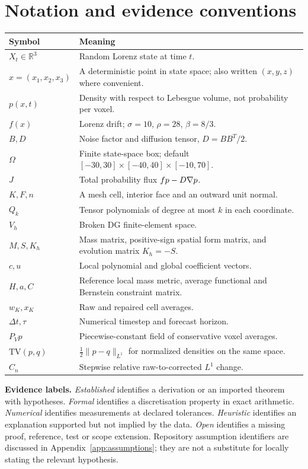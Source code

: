 \documentclass[11pt,oneside]{book}
\theoremstyle{definition}\newtheorem{definition}[theorem]{Definition}\newtheorem{example}[theorem]{Example}
\theoremstyle{remark}\newtheorem{remark}[theorem]{Remark}
\newcommand{\R}{\mathbb R}\newcommand{\E}{\mathbb E}\newcommand{\Prob}{\mathbb P}
\begin{document}
\chapter*{Notation and evidence conventions}
\begin{longtable}{p{}p{}}
\toprule Symbol & Meaning\\\midrule\endhead
$X_t\in\R^3$ & Random Lorenz state at time $t$.\\
$x=(x_1,x_2,x_3)$ & A deterministic point in state space; also written $(x,y,z)$ where convenient.\\
$p(x,t)$ & Density with respect to Lebesgue volume, not probability per voxel.\\
$f(x)$ & Lorenz drift; $\sigma=10$, $\rho=28$, $\beta=8/3$.\\
$B,D$ & Noise factor and diffusion tensor, $D=BB^T/2$.\\
$\Omega$ & Finite state-space box; default $[-30,30]\times[-40,40]\times[-10,70]$.\\
$J$ & Total probability flux $fp-D\nabla p$.\\
$K,F,n$ & A mesh cell, interior face and an outward unit normal.\\
$Q_k$ & Tensor polynomials of degree at most $k$ in each coordinate.\\
$V_h$ & Broken DG finite-element space.\\
$M,S,K_h$ & Mass matrix, positive-sign spatial form matrix, and evolution matrix $K_h=-S$.\\
$c,u$ & Local polynomial and global coefficient vectors.\\
$H,a,C$ & Reference local mass metric, average functional and Bernstein constraint matrix.\\
$w_K,x_K$ & Raw and repaired cell averages.\\
$\Delta t,\tau$ & Numerical timestep and forecast horizon.\\
$P_Vp$ & Piecewise-constant field of conservative voxel averages.\\
$\mathrm{TV}(p,q)$ & $\frac12\|p-q\|_{L^1}$ for normalized densities on the same space.\\
$C_n$ & Stepwise relative raw-to-corrected $L^1$ change.\\
\bottomrule\end{longtable}
\noindent\textbf{Evidence labels.} \emph{Established} identifies a derivation or an imported theorem with hypotheses. \emph{Formal} identifies a discretisation property in exact arithmetic. \emph{Numerical} identifies measurements at declared tolerances. \emph{Heuristic} identifies an explanation supported but not implied by the data. \emph{Open} identifies a missing proof, reference, test or scope extension. Repository assumption identifiers are discussed in Appendix~\ref{app:assumptions}; they are not a substitute for locally stating the relevant hypothesis.
\mainmatter




\appendix



\backmatter

\end{document}
